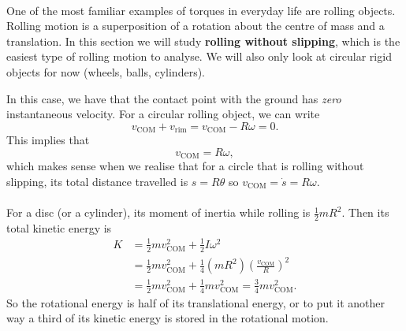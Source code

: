 \documentclass[../classical_mechanics.tex]{subfiles}
\begin{document}
        \paragraph{}
        One of the most familiar examples of torques in everyday life are rolling objects.
        Rolling motion is a superposition of a rotation about the centre of mass and a translation.
        In this section we will study \textbf{rolling without slipping}, which is the easiest type of rolling motion to analyse.
        We will also only look at circular rigid objects for now (wheels, balls, cylinders).
        \begin{figure}[H]
            \centering
        \end{figure}
        In this case, we have that the contact point with the ground has \textit{zero} instantaneous velocity.
        For a circular rolling object, we can write
        \begin{equation}
            v_\text{COM}+v_\text{rim}=v_\text{COM}-R\omega=0.
        \end{equation}
        This implies that
        \begin{equation}
            v_\text{COM}=R\omega,
        \end{equation}
        which makes sense when we realise that for a circle that is rolling without slipping, its total distance travelled is $s=R\theta$ so $v_\text{COM}=\dot{s}=R\omega$.

        \paragraph{}
        For a disc (or a cylinder), its moment of inertia while rolling is $\frac{1}{2}mR^2$.
        Then its total kinetic energy is
        \begin{align}
            K&=\frac{1}{2}mv_\text{COM}^2+\frac{1}{2}I\omega^2\\
            &=\frac{1}{2}mv_\text{COM}^2+\frac{1}{4}(mR^2)\left(\frac{v_\text{COM}}{R}\right)^2\\
            &=\frac{1}{2}mv_\text{COM}^2+\frac{1}{4}mv_\text{COM}^2=\frac{3}{4}mv_\text{COM}^2.
        \end{align}
        So the rotational energy is half of its translational energy, or to put it another way a third of its kinetic energy is stored in the rotational motion.
\end{document}
